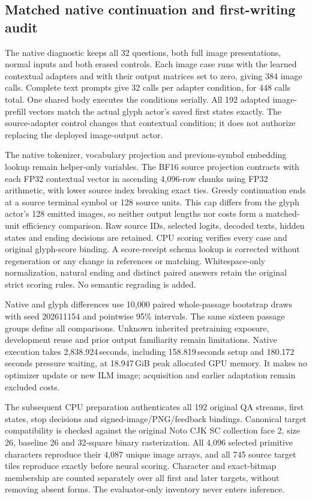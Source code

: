 \documentclass[12pt,a4paper]{article}
\providecommand{\DIFadd}[1]{{\protect\color{blue} \sf #1}} %
\begin{document}
\subsection*{\DIFadd{Matched native continuation and first-writing audit}}
\DIFadd{The native diagnostic keeps all 32 questions, both full image presentations,
normal inputs and both erased controls. Each image case runs with the learned
contextual adapters and with their output matrices set to zero, giving 384
image calls. Complete text prompts give 32 calls per adapter condition,
for 448 calls total. One shared body executes the conditions serially.
All 192 adapted image-prefill vectors match the actual glyph actor's saved
first states exactly. The source-adapter control changes that contextual
condition; it does not authorize replacing the deployed image-output actor.
}

\DIFadd{The native tokenizer, vocabulary projection and previous-symbol embedding
lookup remain helper-only variables. The BF16 source projection contracts
with each FP32 contextual vector in ascending 4,096-row chunks using FP32
arithmetic, with lower source index breaking exact ties. Greedy continuation
ends at a source terminal symbol or 128 source units. This cap differs from
the glyph actor's 128 emitted images, so neither output lengths nor costs
form a matched-unit efficiency comparison. Raw source IDs, selected logits, decoded
texts, hidden states and ending decisions are retained. CPU scoring verifies
every case and original glyph-score binding. A score-receipt schema lookup
is corrected without regeneration or any change in references or matching.
Whitespace-only normalization, natural ending and distinct paired answers
retain the original strict scoring rules. No semantic regrading is added.
}

\DIFadd{Native and glyph differences use 10,000 paired whole-passage bootstrap draws
with seed 202611154 and pointwise 95\% intervals. The same sixteen passage
groups define all comparisons. Unknown inherited pretraining exposure,
development reuse and prior output familiarity remain limitations. Native
execution takes 2,838.924\,seconds, including 158.819\,seconds setup and 180.172\,seconds
pressure waiting, at 18.947\,GiB peak allocated GPU memory. It makes no optimizer
update or new ILM image; acquisition and earlier adaptation remain excluded
costs.
}

\DIFadd{The subsequent CPU preparation authenticates all 192 original QA streams,
first states, stop decisions and signed-image/PNG/feedback bindings. Canonical
target compatibility is checked against the original Noto CJK SC collection
face 2, size 26, baseline 26 and 32-square binary rasterization. All 4,096 selected
primitive characters reproduce their 4,087 unique image arrays, and all 745
source target tiles reproduce exactly before neural scoring. Character and
exact-bitmap membership are counted separately over all first and later
targets, without removing absent forms. The evaluator-only inventory never
enters inference.
}
\end{document}
